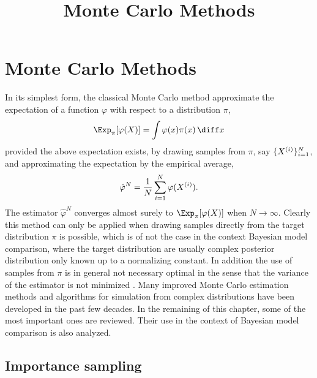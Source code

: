 \ifx\inthesis\undefined %

\title{Monte Carlo Methods}

\maketitle
\else %
\chapter{Monte Carlo Methods}
\label{cha:Monte Carlo Methods}
\fi %

In its simplest form, the classical Monte Carlo method approximate the
expectation of a function $\varphi$ with respect to a distribution $\pi$,
\begin{equation}
  \Exp_{\pi}[\varphi(X)] = \int\varphi(x)\pi(x)\intd x
\end{equation}
provided the above expectation exists, by drawing \iid samples from $\pi$, say
$\{X^{(i)}\}_{i=1}^N$, and approximating the expectation by the empirical average,
\begin{equation}
  \hat\varphi^N = \frac{1}{N}\sum_{i=1}^N\varphi(X^{(i)}).
  \label{eq:vanilla mc}
\end{equation}
The estimator $\hat\varphi^N$ converges almost surely to
$\Exp_{\pi}[\varphi(X)]$ when $N\to\infty$.  Clearly this method can only be
applied when drawing samples directly from the target distribution $\pi$ is
possible, which is of not the case in the context Bayesian model comparison,
where the target distribution are usually complex posterior distribution only
known up to a normalizing constant. In addition the use of samples from $\pi$
is in general not necessary optimal in the sense that the variance of the
estimator is not minimized \parencite[see][sec.~3.3]{Robert:2004tn}. Many
improved Monte Carlo estimation methods and algorithms for simulation from
complex distributions have been developed in the past few decades. In the
remaining of this chapter, some of the most important ones are reviewed. Their
use in the context of Bayesian model comparison is also analyzed.

\section{Importance sampling}
\label{sec:Importance sampling}


